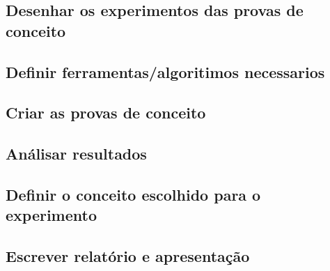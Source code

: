 \subsection{Desenhar os experimentos das provas de conceito}
\subsection{Definir ferramentas/algoritimos necessarios}
\subsection{Criar as provas de conceito}
\subsection{Análisar resultados}
\subsection{Definir o conceito escolhido para o experimento}
\subsection{Escrever relatório e apresentação}